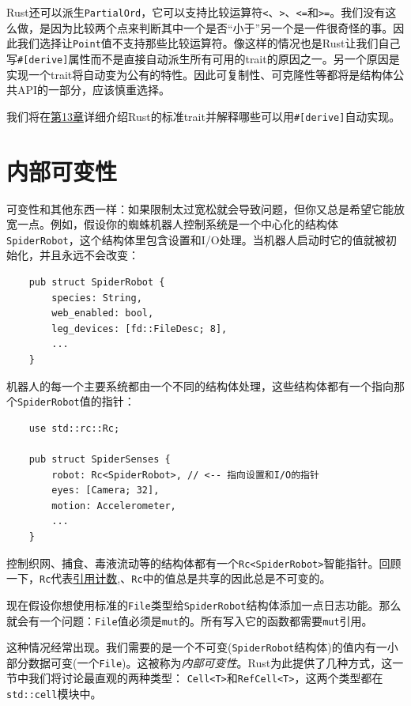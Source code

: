 Rust还可以派生\texttt{PartialOrd}，它可以支持比较运算符\texttt{<}、\texttt{>}、\texttt{<=}和\texttt{>=}。我们没有这么做，是因为比较两个点来判断其中一个是否“小于”另一个是一件很奇怪的事。因此我们选择让\texttt{Point}值不支持那些比较运算符。像这样的情况也是Rust让我们自己写\texttt{\#[derive]}属性而不是直接自动派生所有可用的trait的原因之一。另一个原因是实现一个trait将自动变为公有的特性。因此可复制性、可克隆性等都将是结构体公共API的一部分，应该慎重选择。

我们将在\hyperref[ch13]{第13章}详细介绍Rust的标准trait并解释哪些可以用\texttt{\#[derive]}自动实现。

\section{内部可变性}\label{intermut}

可变性和其他东西一样：如果限制太过宽松就会导致问题，但你又总是希望它能放宽一点。例如，假设你的蜘蛛机器人控制系统是一个中心化的结构体\texttt{SpiderRobot}，这个结构体里包含设置和I/O处理。当机器人启动时它的值就被初始化，并且永远不会改变：
\begin{verbatim}
    pub struct SpiderRobot {
        species: String,
        web_enabled: bool,
        leg_devices: [fd::FileDesc; 8],
        ...
    }
\end{verbatim}

机器人的每一个主要系统都由一个不同的结构体处理，这些结构体都有一个指向那个\texttt{SpiderRobot}值的指针：
\begin{verbatim}
    use std::rc::Rc;

    pub struct SpiderSenses {
        robot: Rc<SpiderRobot>, // <-- 指向设置和I/O的指针
        eyes: [Camera; 32],
        motion: Accelerometer,
        ...
    }
\end{verbatim}

控制织网、捕食、毒液流动等的结构体都有一个\texttt{Rc<SpiderRobot>}智能指针。回顾一下，\texttt{Rc}代表\hyperref[rc]{引用计数},、\texttt{Rc}中的值总是共享的因此总是不可变的。

现在假设你想使用标准的\texttt{File}类型给\texttt{SpiderRobot}结构体添加一点日志功能。那么就会有一个问题：\texttt{File}值必须是\texttt{mut}的。所有写入它的函数都需要\texttt{mut}引用。

这种情况经常出现。我们需要的是一个不可变(\texttt{SpiderRobot}结构体)的值内有一小部分数据可变(一个\texttt{File})。这被称为\emph{内部可变性}。Rust为此提供了几种方式，这一节中我们将讨论最直观的两种类型：
\texttt{Cell<T>}和\texttt{RefCell<T>}，这两个类型都在\texttt{std::cell}模块中。

